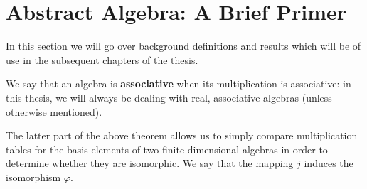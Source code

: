 \section{Abstract Algebra: A Brief Primer}\label{s:algebra}
In this section we will go over background definitions and results which will be of use in the subsequent chapters of the thesis.

%
%
%
%
%
%
%
%
%
%



We say that an algebra is \textbf{associative} when its multiplication is associative: in this thesis, we will always be dealing with real, associative algebras (unless otherwise mentioned).






	
The latter part of the above theorem allows us to simply compare multiplication tables for the basis elements of two finite-dimensional algebras in order to determine whether they are isomorphic. We say that the mapping $j$ induces the isomorphism $\varphi$.

%





